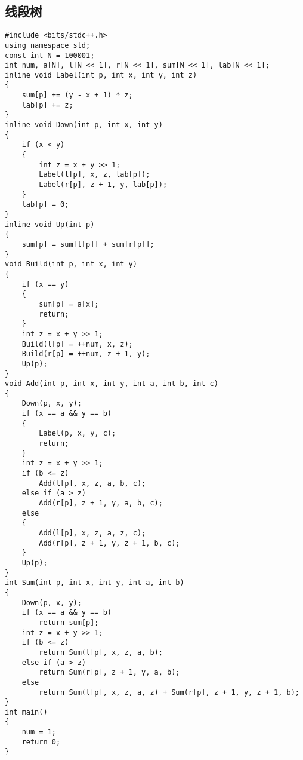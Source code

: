 \documentclass[a4paper]{article}
\begin{document}
\subsection{线段树}
\begin{lstlisting}
#include <bits/stdc++.h>
using namespace std;
const int N = 100001;
int num, a[N], l[N << 1], r[N << 1], sum[N << 1], lab[N << 1];
inline void Label(int p, int x, int y, int z)
{
    sum[p] += (y - x + 1) * z;
    lab[p] += z;
}
inline void Down(int p, int x, int y)
{
    if (x < y)
    {
        int z = x + y >> 1;
        Label(l[p], x, z, lab[p]);
        Label(r[p], z + 1, y, lab[p]);
    }
    lab[p] = 0;
}
inline void Up(int p)
{
    sum[p] = sum[l[p]] + sum[r[p]];
}
void Build(int p, int x, int y)
{
    if (x == y)
    {
        sum[p] = a[x];
        return;
    }
    int z = x + y >> 1;
    Build(l[p] = ++num, x, z);
    Build(r[p] = ++num, z + 1, y);
    Up(p);
}
void Add(int p, int x, int y, int a, int b, int c)
{
    Down(p, x, y);
    if (x == a && y == b)
    {
        Label(p, x, y, c);
        return;
    }
    int z = x + y >> 1;
    if (b <= z)
        Add(l[p], x, z, a, b, c);
    else if (a > z)
        Add(r[p], z + 1, y, a, b, c);
    else
    {
        Add(l[p], x, z, a, z, c);
        Add(r[p], z + 1, y, z + 1, b, c);
    }
    Up(p);
}
int Sum(int p, int x, int y, int a, int b)
{
    Down(p, x, y);
    if (x == a && y == b)
        return sum[p];
    int z = x + y >> 1;
    if (b <= z)
        return Sum(l[p], x, z, a, b);
    else if (a > z)
        return Sum(r[p], z + 1, y, a, b);
    else
        return Sum(l[p], x, z, a, z) + Sum(r[p], z + 1, y, z + 1, b);
}
int main()
{
    num = 1;
    return 0;
}
\end{lstlisting}
\end{document}
